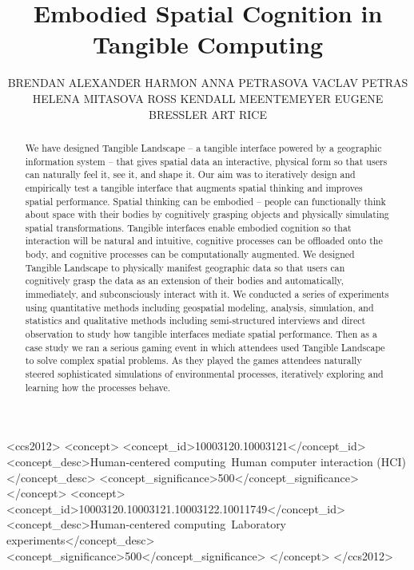 \documentclass[prodmode,acmtochi]{acmsmall} %
\begin{document}

\title{Embodied Spatial Cognition in Tangible Computing} %
\author{BRENDAN ALEXANDER HARMON
ANNA PETRASOVA
VACLAV PETRAS
HELENA MITASOVA
ROSS ​KENDALL MEENTEMEYER
EUGENE BRESSLER
ART RICE
}

\begin{abstract}
%
We have designed Tangible Landscape -- a tangible interface powered by a geographic information system -- 
that gives spatial data an interactive, physical form so that users can naturally feel it, see it, and shape it.
%
Our aim was to iteratively design and empirically test a tangible interface that augments spatial thinking and improves spatial performance. 
%
Spatial thinking can be embodied -- people can functionally think about space with their bodies by cognitively grasping objects and physically simulating spatial transformations.
%
Tangible interfaces enable embodied cognition so that 
interaction will be natural and intuitive,
cognitive processes can be offloaded onto the body,
and cognitive processes can be computationally augmented.
%
We designed Tangible Landscape to physically manifest geographic data %
so that users can cognitively grasp the data as an extension of their bodies 
and automatically, immediately, and subconsciously interact with it. 
%
We conducted a series of experiments using quantitative methods including geospatial modeling, analysis, simulation, and statistics and qualitative methods including semi-structured interviews and direct observation
to study how tangible interfaces mediate spatial performance. 
%
%
Then as a case study we ran a serious gaming event 
in which attendees used Tangible Landscape to solve complex spatial problems. 
%
As they played the games
attendees naturally steered sophisticated simulations of environmental processes,
iteratively exploring and learning how the processes behave. 
%
\end{abstract}

%
%
\begin{CCSXML}
<ccs2012>
<concept>
<concept_id>10003120.10003121</concept_id>
<concept_desc>Human-centered computing~Human computer interaction (HCI)</concept_desc>
<concept_significance>500</concept_significance>
</concept>
<concept>
<concept_id>10003120.10003121.10003122.10011749</concept_id>
<concept_desc>Human-centered computing~Laboratory experiments</concept_desc>
<concept_significance>500</concept_significance>
</concept>
</ccs2012>
\end{CCSXML}
\end{document}
